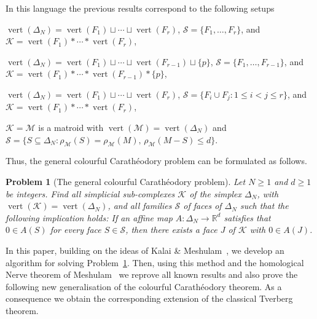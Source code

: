 \documentclass[a4paper,11pt,reqno, english]{amsart}
\newtheorem{problem}[theorem]{Problem}
\theoremstyle{definition}
\theoremstyle{remark}
\newcommand\R{\mathbb R}
\DeclareMathOperator{\vertex}{\mathrm{vert}}
\begin{document}
\medskip
In this language the previous results correspond to the following setups
\begin{compactitem}[\quad --]
	\item[\quad -- Theorem~\ref{th : colourful_Caratheodory_01}:]
	$\vertex(\Delta_N)=\vertex(F_1)\sqcup\cdots\sqcup \vertex(F_{r})$, $\mathcal{S}=\{F_1,\dots,F_r\}$, and $\mathcal{K}=\vertex(F_1)*\cdots * \vertex(F_{r})$,
	\item[\quad-- Theorem~\ref{th : colourful_Caratheodory_02}:]
	$\vertex(\Delta_N)=\vertex(F_1)\sqcup\cdots\sqcup \vertex(F_{r-1})\sqcup\{p\}$, $\mathcal{S}=\{F_1,\dots,F_{r-1}\}$, and $\mathcal{K}=\vertex(F_1)*\cdots * \vertex(F_{r-1})*\{p\}$,
	\item[\quad--  Theorem~\ref{th : colourful_Caratheodory_03}:]
	$\vertex(\Delta_N)=\vertex(F_1)\sqcup\cdots\sqcup \vertex(F_{r})$, $\mathcal{S}=\{F_i\cup F_j : 1\leq i<j\leq r\}$, and $\mathcal{K}=\vertex(F_1)*\cdots * \vertex(F_{r})$,
	\item[\quad-- Theorem~\ref{th : colourful_Caratheodory_04}:] $\mathcal{K}=\mathcal{M}$ is a matroid with $\vertex(\mathcal{M})=\vertex(\Delta_N)$ and $\mathcal{S}=\{ S\subseteq\Delta_N : \rho_{\mathcal{M}}(S)=\rho_{\mathcal{M}}(M),\,\rho_{\mathcal{M}}(M-S)\leq d\}$.
\end{compactitem}
Thus, the general colourful Carath\'eodory problem can be formulated as follows.

\medskip
\begin{problem}[The general colourful Carath\'eodory problem]\label{prob : general_colourful_Caratheodory theorem}
Let $N\geq 1$ and $d\geq 1$ be integers.
Find all simplicial sub-complexes $\mathcal{K}$ of the simplex $\Delta_N$, with $\vertex(\mathcal{K})=\vertex(\Delta_N)$, and all families $\mathcal{S}$ of faces of $\Delta_N$ such that the following implication holds: If an affine map $A\colon\Delta_N\longrightarrow\R^d$ satisfies that $0\in A(S)$ for every face $S\in \mathcal{S}$, then there exists a face $J$ of $\mathcal{K}$ with $0\in A(J)$.
\end{problem}

In this paper, building on the ideas of Kalai \& Meshulam~\cite{KalaiMeshulam2005}, we develop an algorithm for solving Problem~\ref{prob : general_colourful_Caratheodory theorem}.
Then, using this method and the homological Nerve theorem of Meshulam~\cite{Meshulam2001} we reprove all known results and also prove the following new generalisation of the colourful Carath\'eodory theorem.
As a consequence we obtain the corresponding extension of the classical Tverberg theorem.
\end{document}
